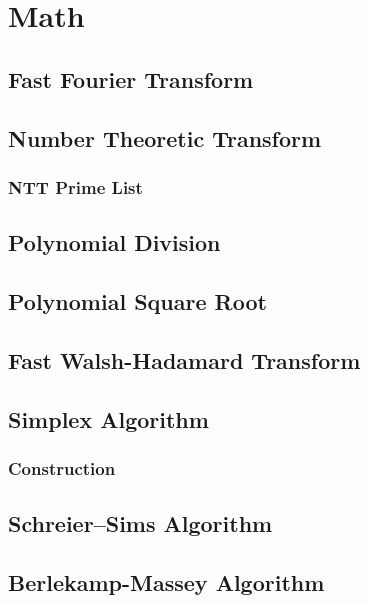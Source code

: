 \documentclass[a4paper,10pt,twocolumn,oneside]{article}
\begin{document}
\section{Math}
\subsection{Fast Fourier Transform}

\subsection{Number Theoretic Transform}

\subsubsection{NTT Prime List}

\subsection{Polynomial Division}

\subsection{Polynomial Square Root}

\subsection{Fast Walsh-Hadamard Transform}
% 

\subsection{Simplex Algorithm}

\subsubsection{Construction}

\subsection{Schreier–Sims Algorithm}

\subsection{Berlekamp-Massey Algorithm}

% 
\end{document}
